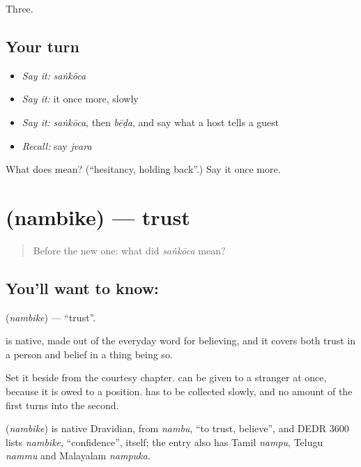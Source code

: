 \begin{grammarlens}[title={What you've built}]
Three.
\end{grammarlens}

\subsection*{Your turn}
\begin{itemize}
\raggedright
  \item \emph{Say it:} \emph{saṅkōca}
  \item \emph{Say it:} it once more, slowly
  \item \emph{Say it:} \emph{saṅkōca}, then \emph{bēḍa}, and say what a host tells a guest
  \item \emph{Recall:} say \emph{jvara}
\end{itemize}

\begin{tcolorbox}[breakable,colback=teal!4,colframe=teal!35!black,title={Before you move on}]
What does  mean? (\textquotedblleft{}hesitancy, holding back\textquotedblright{}.) Say it once more.
\end{tcolorbox}
\section[\texorpdfstring{\kn{ನಂಬಿಕೆ} (nambike)}{ನಂಬಿಕೆ (nambike)}]{ (nambike) — trust}

\label{lesson:KA-C65-trust}



\begin{quote}
Before the new one: what did \emph{saṅkōca} mean?
\end{quote}

\subsection*{You'll want to know: }
\textbf{} (\emph{nambike}) — \textquotedblleft{}trust\textquotedblright{}.

 is native, made out of the everyday word for believing, and it covers both trust in a person and belief in a thing being so.

Set it beside  from the courtesy chapter.  can be given to a stranger at once, because it is owed to a position.  has to be collected slowly, and no amount of the first turns into the second.

\begin{cousinweb}
\textbf{} (\emph{nambike}) is native Dravidian, from \emph{nambu}, \textquotedblleft{}to trust, believe\textquotedblright{}, and DEDR 3600 lists \emph{nambike}, \textquotedblleft{}confidence\textquotedblright{}, itself; the entry also has Tamil \emph{nampu}, Telugu \emph{nammu} and Malayalam \emph{nampuka}.
\end{cousinweb}

